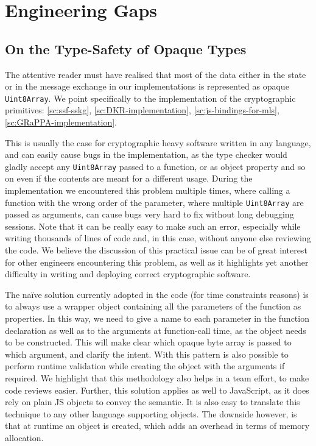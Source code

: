 \chapter{Engineering Gaps}\label{ch:gaps}



\section{On the Type-Safety of Opaque Types}\label{sc:gap-type-safety-of-opaque-byte-arrays}
The attentive reader must have realised that most of the data either in the state
or in the message exchange in our implementations is represented as opaque \texttt{Uint8Array}.
We point specifically to the implementation of the cryptographic primitives:
\cref{sc:ssf-sskg}, \cref{sc:DKR-implementation}, \cref{sc:js-bindings-for-mls}, \cref{sc:GRaPPA-implementation}.

This is usually the case for cryptographic heavy software written in any language, 
and can easily cause bugs in the implementation, as the type checker
would gladly accept any \texttt{Uint8Array} passed to a function, or as object 
property and so on even if the contents are meant for a different usage. 
During the implementation we encountered this problem multiple times,
where calling a function with the wrong order of the parameter, where
multiple \texttt{Uint8Array} are passed as arguments, can cause bugs
very hard to fix without long debugging sessions. Note that it can be
really easy to make such an error, especially while writing thousands
of lines of code and, in this case, without anyone else reviewing the code.
We believe the discussion of this practical issue can be of great interest for other
engineers encountering this problem, as well as it highlights yet another
difficulty in writing and deploying correct cryptographic software.

The na\"ive solution currently adopted in the code (for time constraints reasons)
is to always use a wrapper object containing all the parameters of the function
as properties. In this way, we need to give a name to each parameter
in the function declaration as well as to the arguments at function-call
time, as the object needs to be constructed. This will make clear which
opaque byte array is passed to which argument, and clarify the intent.
With this pattern is also possible to perform runtime validation
while creating the object with the arguments if required.
We highlight that this methodology also helps in a team effort, to make
code reviews easier. Further, this solution applies as well to JavaScript,
as it does rely on plain JS objects to convey the semantic. It is also
easy to translate this technique to any other language supporting objects.
The downside however, is that at runtime an object is created, which adds 
an overhead in terms of memory allocation.

